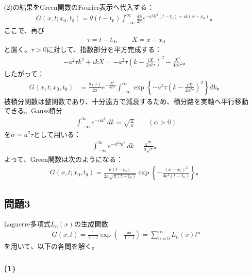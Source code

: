 \documentclass[platex,dvipdfmx,a4paper]{jsarticle}
\begin{document}
  (2)の結果をGreen関数のFourier表示へ代入する：
  \begin{align*}
    G(x,t;x_0,t_0)
    =
    \theta(t-t_0)
    \int_{-\infty}^{\infty}\frac{dk}{2\pi}
    e^{-a^2k^2(t-t_0)+ik(x-x_0)}。
  \end{align*}
  ここで、再び
  \begin{align*}
    \tau=t-t_0,
    \qquad
    X=x-x_0
  \end{align*}
  と置く。$\tau>0$に対して、指数部分を平方完成する：
  \begin{align*}
    -a^2\tau k^2+ikX
    =-a^2\tau\left(k-\frac{iX}{2a^2\tau}\right)^2
    -\frac{X^2}{4a^2\tau}。
  \end{align*}
  したがって：
  \begin{align*}
    G(x,t;x_0,t_0)
    &=
    \frac{\theta(\tau)}{2\pi}
    e^{-\frac{X^2}{4a^2\tau}}
    \int_{-\infty}^{\infty}
    \exp\left\{
      -a^2\tau\left(k-\frac{iX}{2a^2\tau}\right)^2
    \right\}dk。
  \end{align*}
  被積分関数は整関数であり、十分遠方で減衰するため、積分路を実軸へ平行移動できる。Gauss積分
  \begin{align*}
    \int_{-\infty}^{\infty}e^{-\alpha k^2}\,dk
    =\sqrt{\frac{\pi}{\alpha}}
    \qquad(\alpha>0)
  \end{align*}
  を$\alpha=a^2\tau$として用いる：
  \begin{align*}
    \int_{-\infty}^{\infty}e^{-a^2\tau k^2}\,dk
    =\frac{\sqrt{\pi}}{a\sqrt{\tau}}。
  \end{align*}
  よって、Green関数は次のようになる：
  \begin{align*}
    G(x,t;x_0,t_0)
    =
    \frac{\theta(t-t_0)}
    {2a\sqrt{\pi(t-t_0)}}
    \exp\left\{
      -\frac{(x-x_0)^2}{4a^2(t-t_0)}
    \right\}。
  \end{align*}

  \subsection*{問題3}
  
  Laguerre多項式$L_n(x)$の生成関数
  \begin{align*}
    G(x,t)
    =\frac{1}{1-t}\exp\left(-\frac{xt}{1-t}\right)
    =\sum_{n=0}^{\infty}L_n(x)t^n
  \end{align*}
  を用いて、以下の各問を解く。

  \subsubsection*{(1)}
\end{document}
